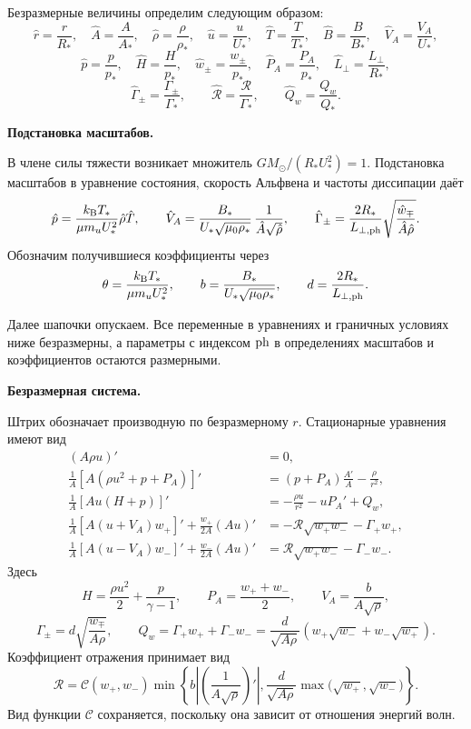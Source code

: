 \documentclass[12pt,a4paper]{article}
\begin{document}
Безразмерные величины определим следующим образом:
\[
\hat r=\frac r{R_*},\quad
\hat A=\frac A{A_*},\quad
\hat\rho=\frac\rho{\rho_*},\quad
\hat u=\frac u{U_*},\quad
\hat T=\frac T{T_*},\quad
\hat B=\frac B{B_*},\quad
\hat V_A=\frac{V_A}{U_*},
\]
\[
\hat p=\frac p{p_*},\quad
\hat H=\frac H{p_*},\quad
\hat w_\pm=\frac{w_\pm}{p_*},\quad
\hat P_A=\frac{P_A}{p_*},\quad
\hat L_\perp=\frac{L_\perp}{R_*},
\]
\[
\hat\Gamma_\pm=\frac{\Gamma_\pm}{\Gamma_*},\qquad
\hat{\mathcal R}=\frac{\mathcal R}{\Gamma_*},\qquad
\hat Q_w=\frac{Q_w}{Q_*}.
\]

\medskip
\noindent\textbf{Подстановка масштабов.}

В члене силы тяжести возникает множитель
$GM_\odot/(R_*U_*^2)=1$.
Подстановка масштабов в уравнение состояния,
скорость Альфвена и частоты диссипации даёт
\[
\hat p
=\frac{k_{\rm B}T_*}{\mu m_uU_*^2}\hat\rho\hat T,
\qquad
\hat V_A
=\frac{B_*}{U_*\sqrt{\mu_0\rho_*}}\,
\frac{1}{\hat A\sqrt{\hat\rho}},
\qquad
\hat\Gamma_\pm
=\frac{2R_*}{L_{\perp,{\rm ph}}}
\sqrt{\frac{\hat w_\mp}{\hat A\hat\rho}}.
\]
Обозначим получившиеся коэффициенты через
\[
\theta=\frac{k_{\rm B}T_*}{\mu m_uU_*^2},\qquad
b=\frac{B_*}{U_*\sqrt{\mu_0\rho_*}},\qquad
d=\frac{2R_*}{L_{\perp,{\rm ph}}}.
\]

Далее шапочки опускаем. Все переменные в уравнениях
и граничных условиях ниже безразмерны, а параметры
с индексом ${\rm ph}$ в определениях масштабов
и коэффициентов остаются размерными.

\medskip
\noindent\textbf{Безразмерная система.}

Штрих обозначает производную по безразмерному $r$.
Стационарные уравнения имеют вид
\begingroup
\small
\begin{align*}
(A\rho u)'&=0,\\[4pt]
\frac1A\left[A(\rho u^2+p+P_A)\right]'
&=(p+P_A)\frac{A'}A-\frac{\rho}{r^2},\\[4pt]
\frac1A\left[Au(H+p)\right]'
&=-\frac{\rho u}{r^2}-uP_A'+Q_w,\\[4pt]
\frac1A\left[A(u+V_A)w_+\right]'
+\frac{w_+}{2A}(Au)'
&=-\mathcal R\sqrt{w_+w_-}-\Gamma_+w_+,\\[4pt]
\frac1A\left[A(u-V_A)w_-\right]'
+\frac{w_-}{2A}(Au)'
&=\mathcal R\sqrt{w_+w_-}-\Gamma_-w_-.
\end{align*}
\endgroup
Здесь
\[
H=\frac{\rho u^2}{2}+\frac{p}{\gamma-1},
\qquad
P_A=\frac{w_++w_-}{2},
\qquad
V_A=\frac{b}{A\sqrt\rho},
\]
\[
\Gamma_\pm=d\sqrt{\frac{w_\mp}{A\rho}},
\qquad
Q_w=\Gamma_+w_++\Gamma_-w_-
=\frac{d}{\sqrt{A\rho}}
\left(w_+\sqrt{w_-}+w_-\sqrt{w_+}\right).
\]
Коэффициент отражения принимает вид
\[
\mathcal R
=\mathcal C(w_+,w_-)
\min\left\{
b\left|\left(\frac{1}{A\sqrt\rho}\right)'\right|,
\frac{d}{\sqrt{A\rho}}
\max\bigl(\sqrt{w_+},\sqrt{w_-}\bigr)
\right\}.
\]
Вид функции $\mathcal C$ сохраняется, поскольку
она зависит от отношения энергий волн.
\end{document}
